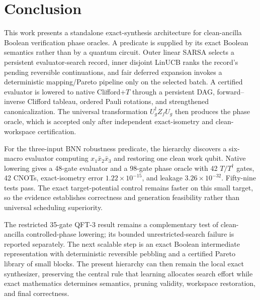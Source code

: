 \section{Conclusion}

This work presents a standalone exact-synthesis architecture for clean-ancilla Boolean verification phase oracles.  A predicate is supplied by its exact Boolean semantics rather than by a quantum circuit.  Outer linear SARSA selects a persistent evaluator-search record, inner disjoint LinUCB ranks the record's pending reversible continuations, and fair deferred expansion invokes a deterministic mapping/Pareto pipeline only on the selected batch.  A certified evaluator is lowered to native Clifford+$T$ through a persistent DAG, forward--inverse Clifford tableau, ordered Pauli rotations, and strengthened canonicalization.  The universal transformation $U_g^\dagger Z_fU_g$ then produces the phase oracle, which is accepted only after independent exact-isometry and clean-workspace certification.

For the three-input BNN robustness predicate, the hierarchy discovers a six-macro evaluator computing $x_1\bar x_2\bar x_3$ and restoring one clean work qubit.  Native lowering gives a 48-gate evaluator and a 98-gate phase oracle with 42 $T/T^\dagger$ gates, 42 CNOTs, exact-isometry error $1.22\times10^{-15}$, and leakage $3.26\times10^{-32}$.  Fifty-nine tests pass.  The exact target-potential control remains faster on this small target, so the evidence establishes correctness and generation feasibility rather than universal scheduling superiority.

The restricted 35-gate QFT-3 result remains a complementary test of clean-ancilla controlled-phase lowering; its bounded unrestricted-search failure is reported separately.  The next scalable step is an exact Boolean intermediate representation with deterministic reversible pebbling and a certified Pareto library of small blocks.  The present hierarchy can then remain the local exact synthesizer, preserving the central rule that learning allocates search effort while exact mathematics determines semantics, pruning validity, workspace restoration, and final correctness.
